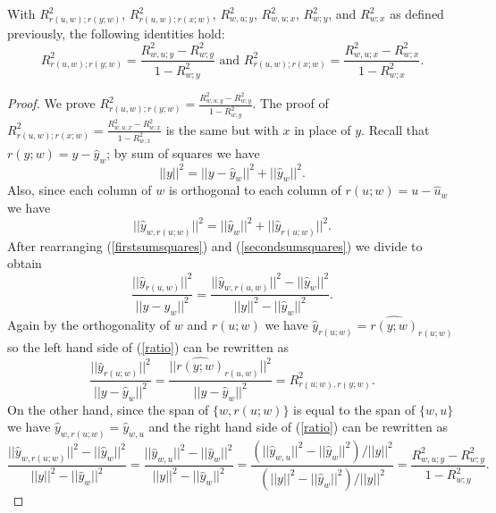 \documentclass[10pt,a4paper]{amsart}
\begin{document}
\begin{proposition}
\label{mainprop}
With $R^2_{r(u,w);r(y;w)}$, $R^2_{r(u,w);r(x;w)}$, $R^2_{w,u;y}$, $R^2_{w,u;x}$, $R^2_{w;y}$, and $R^2_{w;x}$ as defined previously, the following identities hold: 
\begin{equation}\label{mainpropeq}R^2_{r(u,w);r(y;w)}=\frac{R^2_{w,u;y}-R^2_{w;y}}{1-R^2_{w;y}}\textrm{~and~}R^2_{r(u,w);r(x;w)}=\frac{R^2_{w,u;x}-R^2_{w;x}}{1-R^2_{w;x}}.\end{equation}
\end{proposition}

\begin{proof}
We prove $R^2_{r(u,w);r(y;w)}=\frac{R^2_{w,u;y}-R^2_{w;y}}{1-R^2_{w;y}}$. The proof of $R^2_{r(u,w);r(x;w)}=\frac{R^2_{w,u;x}-R^2_{w;x}}{1-R^2_{w;x}}$ is the same but with $x$ in place of $y$. Recall that $r(y;w)=y-\hat{y}_w$; by sum of squares we have
\begin{equation}
\label{firstsumsquares}
||y||^2=||y-\hat{y}_w||^2+||\hat{y}_w||^2.
\end{equation}
Also, since each column of $w$ is orthogonal to each column of $r(u;w)=u-\hat{u}_w$ we have
\begin{equation}
\label{secondsumsquares}
||\hat{y}_{w,r(u;w)}||^2=||\hat{y}_w||^2+||\hat{y}_{r(u;w)}||^2.
\end{equation}
After rearranging (\ref{firstsumsquares}) and (\ref{secondsumsquares}) we divide to obtain
\begin{equation}
\label{ratio}
\frac{||\hat{y}_{r(u,w)}||^2}{||y-\hat{y}_w||^2}=\frac{||\hat{y}_{w,r(u,w)}||^2-||\hat{y}_w||^2}{||y||^2-||\hat{y}_w||^2}.
\end{equation}
Again by the orthogonality of $w$ and $r(u;w)$ we have $\hat{y}_{r(u;w)}=\hat{r(y;w)}_{r(u;w)}$ so the left hand side of (\ref{ratio}) can be rewritten as
\begin{equation}
\label{rephrased}
\frac{||\hat{y}_{r(u;w)}||^2}{||y-\hat{y}_w||^2}=\frac{||\hat{r(y;w)}_{r(u,w)}||^2}{||y-\hat{y}_w||^2}=R^2_{r(u;w),r(y;w)}.
\end{equation} 
On the other hand, since the span of $\{w,r(u;w)\}$ is equal to the span of $\{w,u\}$ we have $\hat{y}_{w,r(u;w)}=\hat{y}_{w,u}$ and the right hand side of (\ref{ratio}) can be rewritten as
\begin{equation}
\label{conclusion}
\frac{||\hat{y}_{w,r(u;w)}||^2-||\hat{y}_w||^2}{||y||^2-||\hat{y}_w||^2}=\frac{||\hat{y}_{w,u}||^2-||\hat{y}_w||^2}{||y||^2-||\hat{y}_w||^2}=\frac{(||\hat{y}_{w,u}||^2-||\hat{y}_w||^2)/||y||^2}{(||y||^2-||\hat{y}_w||^2)/||y||^2}=\frac{R^2_{w,u;y}-R^2_{w;y}}{1-R^2_{w;y}}.
\end{equation}
\end{proof}
\end{document}
